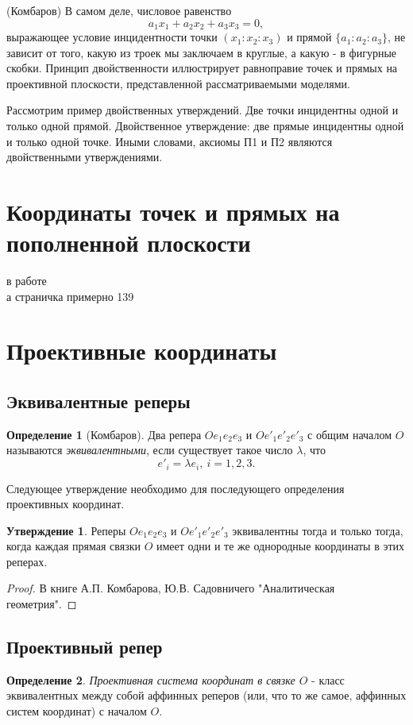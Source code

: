 \documentclass[a4paper, 12pt]{article}
\theoremstyle{definition}
\newtheorem*{definition}{Определение}
\newtheorem*{subtheorem}{Утверждение}
\begin{document}
(Комбаров) В самом деле, числовое равенство \[ a_1x_1 + a_2x_2 + a_3x_3 = 0, \] выражающее условие инцидентности точки $(x_1:x_2:x_3)$ и прямой $\{a_1:a_2:a_3\}$, не зависит от того, какую из троек мы заключаем в круглые, а какую - в фигурные скобки. Принцип двойственности иллюстрирует равноправие точек и прямых на проективной плоскости, представленной рассматриваемыми моделями.

Рассмотрим пример двойственных утверждений. Две точки инцидентны одной и только одной прямой. Двойственное утверждение: две прямые инцидентны одной и только одной точке. Иными словами, аксиомы П1 и П2 являются двойственными утверждениями.

\section{Координаты точек и прямых на пополненной плоскости}
в работе\\
а страничка примерно 139

\section{Проективные координаты}
\subsection{Эквивалентные реперы}
\begin{definition}[Комбаров]
    Два репера $Oe_1e_2e_3$ и $Oe'_1e'_2e'_3$ с общим началом $O$ называются \textit{эквивалентными}, если существует такое число $\lambda$, что \[e'_i = \lambda e_i, \ i = 1,2,3.\]
\end{definition}

Следующее утверждение необходимо для последующего определения проективных координат.

\begin{subtheorem}
    Реперы $Oe_1e_2e_3$ и $Oe'_1e'_2e'_3$ эквивалентны тогда и только тогда, когда каждая прямая связки $O$ имеет одни и те же однородные координаты в этих реперах.
\end{subtheorem}
\begin{proof}
    В книге А.П. Комбарова, Ю.В. Садовничего "Аналитическая геометрия".
\end{proof}

\subsection{Проективный репер}
\begin{definition}
    \textit{Проективная система координат в связке $O$} - класс эквивалентных между собой аффинных реперов (или, что то же самое, аффинных систем координат) с началом $O$.
\end{definition}
\end{document}
